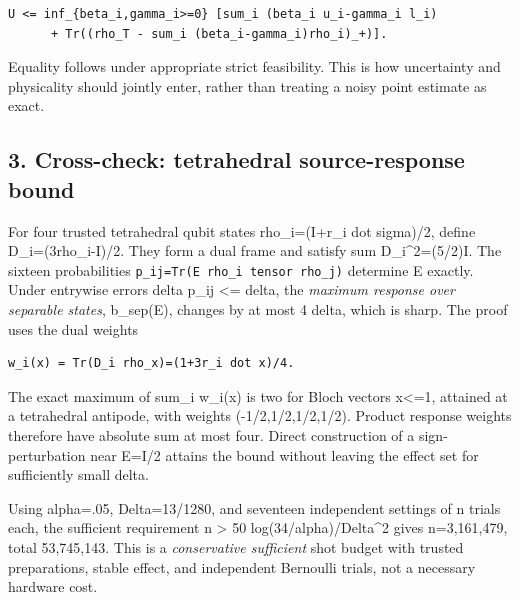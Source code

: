 \documentclass[
  10pt,
  a4paper,
]{article}
\begin{document}
\begin{verbatim}
U <= inf_{beta_i,gamma_i>=0} [sum_i (beta_i u_i-gamma_i l_i)
      + Tr((rho_T - sum_i (beta_i-gamma_i)rho_i)_+)].
\end{verbatim}

Equality follows under appropriate strict feasibility. This is how uncertainty and physicality should jointly enter, rather than treating a noisy point estimate as exact.

\subsection{3. Cross-check: tetrahedral source-response bound}\label{cross-check-tetrahedral-source-response-bound}

For four trusted tetrahedral qubit states rho\_i=(I+r\_i dot sigma)/2, define D\_i=(3rho\_i-I)/2. They form a dual frame and satisfy sum D\_i\^{}2=(5/2)I. The sixteen probabilities \texttt{p\_ij=Tr(E\ rho\_i\ tensor\ rho\_j)} determine E exactly. Under entrywise errors \textbar delta p\_ij\textbar{} \textless= delta, the \emph{maximum response over separable states}, b\_sep(E), changes by at most 4 delta, which is sharp. The proof uses the dual weights

\begin{verbatim}
w_i(x) = Tr(D_i rho_x)=(1+3r_i dot x)/4.
\end{verbatim}

The exact maximum of sum\_i \textbar w\_i(x)\textbar{} is two for Bloch vectors \textbar x\textbar\textless=1, attained at a tetrahedral antipode, with weights (-1/2,1/2,1/2,1/2). Product response weights therefore have absolute sum at most four. Direct construction of a sign-perturbation near E=I/2 attains the bound without leaving the effect set for sufficiently small delta.

Using alpha=.05, Delta=13/1280, and seventeen independent settings of n trials each, the sufficient requirement n \textgreater{} 50 log(34/alpha)/Delta\^{}2 gives n=3,161,479, total 53,745,143. This is a \emph{conservative sufficient} shot budget with trusted preparations, stable effect, and independent Bernoulli trials, not a necessary hardware cost.
\end{document}
